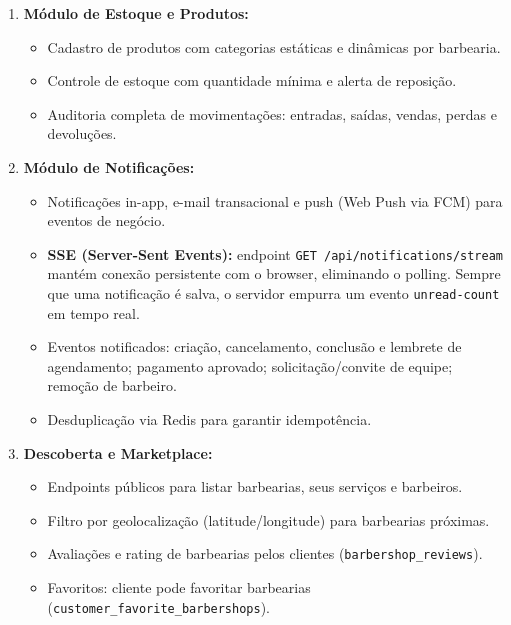 \documentclass[
    12pt, 
    a4paper, 
    oneside, 
    chapter=TITLE, 
    section=TITLE
]{abntex2}
\begin{document}
\begin{enumerate}
\begin{itemize}
            \item Processamento de webhooks com idempotência (tabela \texttt{webhook\_logs}).
            \item Dashboard de KPIs financeiros diários (\texttt{dashboard\_kpi\_daily}).
        \end{itemize}
    \item \textbf{Módulo de Estoque e Produtos:}
        \begin{itemize}
            \item Cadastro de produtos com categorias estáticas e dinâmicas por barbearia.
            \item Controle de estoque com quantidade mínima e alerta de reposição.
            \item Auditoria completa de movimentações: entradas, saídas, vendas, perdas e devoluções.
        \end{itemize}
    \item \textbf{Módulo de Notificações:}
        \begin{itemize}
            \item Notificações in-app, e-mail transacional e push (Web Push via FCM) para eventos de negócio.
            \item \textbf{SSE (Server-Sent Events):} endpoint \texttt{GET /api/notifications/stream} mantém conexão persistente com o browser, eliminando o polling. Sempre que uma notificação é salva, o servidor empurra um evento \texttt{unread-count} em tempo real.
            \item Eventos notificados: criação, cancelamento, conclusão e lembrete de agendamento; pagamento aprovado; solicitação/convite de equipe; remoção de barbeiro.
            \item Desduplicação via Redis para garantir idempotência.
        \end{itemize}
    \item \textbf{Descoberta e Marketplace:}
        \begin{itemize}
            \item Endpoints públicos para listar barbearias, seus serviços e barbeiros.
            \item Filtro por geolocalização (latitude/longitude) para barbearias próximas.
            \item Avaliações e rating de barbearias pelos clientes (\texttt{barbershop\_reviews}).
            \item Favoritos: cliente pode favoritar barbearias (\texttt{customer\_favorite\_barbershops}).
        \end{itemize}
\end{enumerate}
\end{document}
